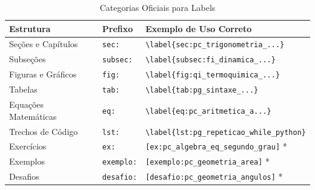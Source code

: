 \begin{table}[h]
    \centering
    \caption{Categorias Oficiais para Labels}
    \label{tab:niv_tutorial_categorias_labels}
    \begin{tabular}{lll}
        \hline
        \textbf{Estrutura} & \textbf{Prefixo} & \textbf{Exemplo de Uso Correto} \\
        \hline
        Seções e Capítulos & \texttt{sec:} & \verb|\label{sec:pc_trigonometria_...}| \\
        Subseções & \texttt{subsec:} & \verb|\label{subsec:fi_dinamica_...}| \\
        Figuras e Gráficos & \texttt{fig:} & \verb|\label{fig:qi_termoquimica_...}| \\
        Tabelas & \texttt{tab:} & \verb|\label{tab:pg_sintaxe_...}| \\
        Equações Matemáticas & \texttt{eq:} & \verb|\label{eq:pc_aritmetica_a...}| \\
        Trechos de Código & \texttt{lst:} & \verb|\label{lst:pg_repeticao_while_python}| \\
        Exercícios & \texttt{ex:} & \verb|[ex:pc_algebra_eq_segundo_grau]| * \\
        Exemplos & \texttt{exemplo:} & \verb|[exemplo:pc_geometria_area]| * \\
        Desafios & \texttt{desafio:} & \verb|[desafio:pc_geometria_angulos]| * \\
        \hline
    \end{tabular}
    
    \fonteNivelamento
\end{table}